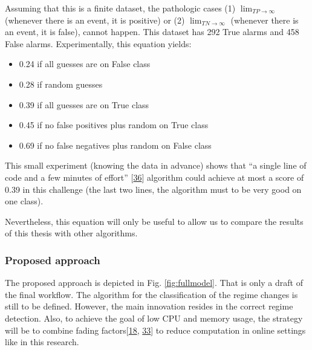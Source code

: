 \documentclass[runningheads]{llncs}
\providecommand{\tightlist}{%
  \setlength{\itemsep}{0pt}\setlength{\parskip}{0pt}}
\begin{document}
Assuming that this is a finite dataset, the pathologic cases (1) \(\lim_{TP \to \infty}\) (whenever
there is an event, it is positive) or (2) \(\lim_{TN \to \infty}\) (whenever there is an event, it is
false), cannot happen. This dataset has 292 True alarms and 458 False alarms. Experimentally, this
equation yields:

\begin{itemize}
\tightlist
\item
  0.24 if all guesses are on False class
\item
  0.28 if random guesses
\item
  0.39 if all guesses are on True class
\item
  0.45 if no false positives plus random on True class
\item
  0.69 if no false negatives plus random on False class
\end{itemize}

This small experiment (knowing the data in advance) shows that ``a single line of code and a few
minutes of effort'' {[}\protect\hyperlink{ref-Wu2020}{36}{]} algorithm could achieve at most a score of 0.39 in this challenge (the
last two lines, the algorithm must to be very good on one class).

Nevertheless, this equation will only be useful to allow us to compare the results of this thesis
with other algorithms.

\hypertarget{proposed-approach}{%
\subsubsection{Proposed approach}\label{proposed-approach}}

The proposed approach is depicted in Fig. \ref{fig:fullmodel}. That is only a draft of the final workflow. The
algorithm for the classification of the regime changes is still to be defined. However, the main innovation resides in
the correct regime detection. Also, to achieve the goal of low CPU and memory usage, the strategy will be to combine
fading factors{[}\protect\hyperlink{ref-Gama2013}{18}, \protect\hyperlink{ref-Rodrigues2010}{33}{]} to reduce computation in online settings like in this research.
\end{document}
